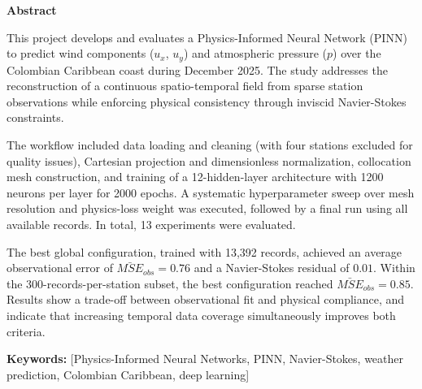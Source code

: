 \begin{flushleft} %
\begin{center}
\textbf{Abstract}
\end{center}
\vspace{0.8\baselineskip}

This project develops and evaluates a Physics-Informed Neural Network (PINN) to predict wind components ($u_x$, $u_y$) and atmospheric pressure ($p$) over the Colombian Caribbean coast during December 2025. The study addresses the reconstruction of a continuous spatio-temporal field from sparse station observations while enforcing physical consistency through inviscid Navier-Stokes constraints.
\vspace{0.5em}

The workflow included data loading and cleaning (with four stations excluded for quality issues), Cartesian projection and dimensionless normalization, collocation mesh construction, and training of a 12-hidden-layer architecture with 1200 neurons per layer for 2000 epochs. A systematic hyperparameter sweep over mesh resolution and physics-loss weight was executed, followed by a final run using all available records. In total, 13 experiments were evaluated.

The best global configuration, trained with 13,392 records, achieved an average observational error of $\bar{MSE}_{obs}=0.76$ and a Navier-Stokes residual of $0.01$. Within the 300-records-per-station subset, the best configuration reached $\bar{MSE}_{obs}=0.85$. Results show a trade-off between observational fit and physical compliance, and indicate that increasing temporal data coverage simultaneously improves both criteria.

\vspace{1em}
\textbf{Keywords:} [Physics-Informed Neural Networks, PINN, Navier-Stokes, weather prediction, Colombian Caribbean, deep learning]
\end{flushleft}
